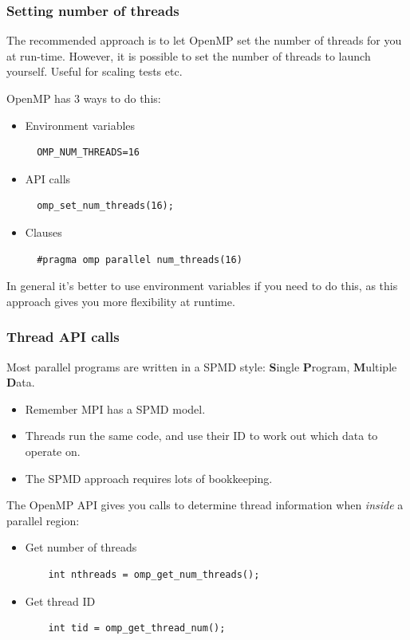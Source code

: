 \documentclass[aspectratio=169]{beamer}
\begin{document}
\begin{frame}[fragile]
\frametitle{Setting number of threads}
The recommended approach is to let OpenMP set the number of threads for you at run-time. However, it is possible to set the number of threads to launch yourself. Useful for scaling tests etc.

OpenMP has 3 ways to do this:
\begin{itemize}
  \item Environment variables
  \begin{verbatim}
  OMP_NUM_THREADS=16
  \end{verbatim}

  \item API calls
  \begin{verbatim}
  omp_set_num_threads(16);
  \end{verbatim}

  \item Clauses
  \begin{verbatim}
  #pragma omp parallel num_threads(16)
  \end{verbatim}
\end{itemize}

In general it's better to use environment variables if you need to do this, as this approach gives you more flexibility at runtime.
\end{frame}

\begin{frame}[fragile]
\frametitle{Thread API calls}
Most parallel programs are written in a SPMD style: \newline
{\bf S}ingle {\bf P}rogram, {\bf M}ultiple {\bf D}ata.
\begin{itemize}
  \item Remember MPI has a SPMD model.
  \item Threads run the same code, and use their ID to work out which data to operate on.
  \item The SPMD approach requires lots of bookkeeping.
\end{itemize}

The OpenMP API gives you calls to determine thread information when \emph{inside} a parallel region:
\begin{itemize}
  \item Get number of threads
    \begin{verbatim}
    int nthreads = omp_get_num_threads();
    \end{verbatim}

  \item Get thread ID
    \begin{verbatim}
    int tid = omp_get_thread_num();
    \end{verbatim}

\end{itemize}
\end{frame}
\end{document}
